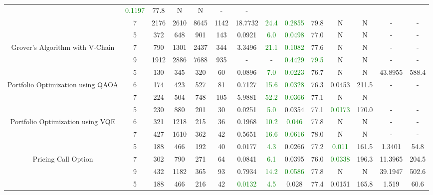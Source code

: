 \begin{table}[htb]
{\begin{tabular}{|c|c|c|c|c|c|c|c|c|c|c|c|c|c|}
 & \textcolor{green}{0.1197} & 77.8
 & N & N 
 & - & -
 \\
 & 
7 & 2176 & 2610 & 8645 & 1142
 & 18.7732 & \textcolor{green}{24.4}
 & \textcolor{green}{0.2855} & 79.8
 & N & N 
 & - & -
 \\
\hline
 & 
5 & 372 & 648 & 901 & 143
 & 0.0921 & \textcolor{green}{6.0}
 & \textcolor{green}{0.0498} & 77.0
 & N & N 
 & - & -
 \\
Grover's Algorithm with V-Chain & 
7 & 790 & 1301 & 2437 & 344
 & 3.3496 & \textcolor{green}{21.1}
 & \textcolor{green}{0.1082} & 77.6
 & N & N 
 & - & -
 \\
 & 
9 & 1912 & 2886 & 7688 & 935
 & - & -
 & \textcolor{green}{0.4429} & \textcolor{green}{79.5}
 & N & N 
 & - & -
 \\
\hline
 & 
5 & 130 & 345 & 320 & 60
 & 0.0896 & \textcolor{green}{7.0}
 & \textcolor{green}{0.0223} & 76.7
 & N & N 
 & 43.8955 & 588.4
 \\
Portfolio Optimization using QAOA & 
6 & 174 & 423 & 527 & 81
 & 0.7127 & \textcolor{green}{15.6}
 & \textcolor{green}{0.0328} & 76.3
 & 0.0453 & 211.5
 & - & -
 \\
 & 
7 & 224 & 504 & 748 & 105
 & 5.9881 & \textcolor{green}{52.2}
 & \textcolor{green}{0.0366} & 77.1
 & N & N 
 & - & -
 \\
\hline
 & 
5 & 230 & 880 & 201 & 30
 & 0.0251 & \textcolor{green}{5.0}
 & 0.0354 & 77.1
 & \textcolor{green}{0.0173} & 170.0
 & - & -
 \\
Portfolio Optimization using VQE & 
6 & 321 & 1218 & 215 & 36
 & 0.1968 & \textcolor{green}{10.2}
 & \textcolor{green}{0.046} & 77.8
 & N & N 
 & - & -
 \\
 & 
7 & 427 & 1610 & 362 & 42
 & 0.5651 & \textcolor{green}{16.6}
 & \textcolor{green}{0.0616} & 78.0
 & N & N 
 & - & -
 \\
\hline
 & 
5 & 188 & 466 & 192 & 40
 & 0.0177 & \textcolor{green}{4.3}
 & 0.0266 & 77.2
 & \textcolor{green}{0.011} & 161.5
 & 1.3401 & 54.8
 \\
Pricing Call Option & 
7 & 302 & 790 & 271 & 64
 & 0.0841 & \textcolor{green}{6.1}
 & 0.0395 & 76.0
 & \textcolor{green}{0.0338} & 196.3
 & 11.3965 & 204.5
 \\
 & 
9 & 432 & 1182 & 365 & 93
 & 0.7934 & \textcolor{green}{14.2}
 & \textcolor{green}{0.0586} & 77.8
 & N & N 
 & 39.1947 & 502.6
 \\
\hline
 & 
5 & 188 & 466 & 216 & 42
 & \textcolor{green}{0.0132} & \textcolor{green}{4.5}
 & 0.028 & 77.4
 & 0.0151 & 165.8
 & 1.519 & 60.6
 \\

\end{tabular}}
\end{table}
